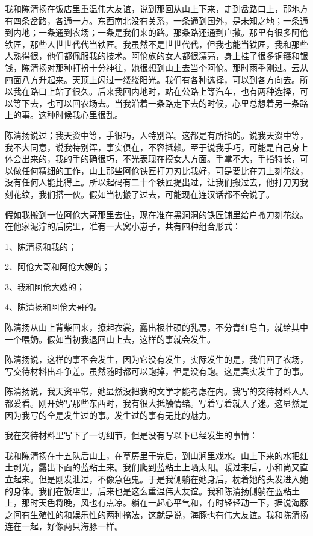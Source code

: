  我和陈清扬在饭店里重温伟大友谊，说到那回从山上下来，走到岔路口上，那地方有四条岔路，各通一方。东西南北没有关系，一条通到国外，是未知之地；一条通到内地；一条通到农场；一条是我们来的路。那条路还通到户撒。那里有很多阿伧铁匠，那些人世世代代当铁匠。我虽然不是世世代代，但我也能当铁匠，我和那些人熟得很，他们都佩服我的技术。阿伧族的女人都很漂亮，身上挂了很多铜箍和银钱，陈清扬对那种打扮十分神往，她很想到山上去当个阿伧。那时雨季刚过。云从四面八方升起来。天顶上闪过一缕缕阳光。我们有各种选择，可以到各方向去。所以我在路口上站了很久。后来我回内地时，站在公路上等汽车，也有两种选择，可以等下去，也可以回农场去。当我沿着一条路走下去的时候，心里总想着另一条路上的事。这种时候我心里很乱。 
 
 陈清扬说过；我天资中等，手很巧，人特别浑。这都是有所指的。说我天资中等，我不大同意，说我特别浑，事实俱在，不容抵赖。至于说我手巧，可能是自己身上体会出来的，我的手的确很巧，不光表现在摸女人方面。手掌不大，手指特长，可以做任何精细的工作，山上那些阿伧铁匠打刀刃比我好，可是要比在刀上刻花纹，没有任何人能比得上。所以起码有二十个铁匠提出过，让我们搬过去，他打刀刃我刻花纹，我们搭一伙。假如当初搬了过去，可能现在连汉话都不会说了。 
 
 假如我搬到一位阿伧大哥那里去住，现在准在黑洞洞的铁匠铺里给户撒刀刻花纹。在他家泥泞的后院里，准有一大窝小崽子，共有四种组合形式： 
 
 1、陈清扬和我的； 
 
 2、阿伧大哥和阿伧大嫂的； 
 
 3、我和阿伧大嫂的； 
 
 4、陈清扬和阿伧大哥的。 
 
 陈清扬从山上背柴回来，撩起衣裳，露出极壮硕的乳房，不分青红皂白，就给其中一个喂奶。假如当初我退回山上去，这样的事就会发生。 
 
 陈清扬说，这样的事不会发生，因为它没有发生，实际发生的是，我们回了农场，写交待材料出斗争差。虽然随时都可以跑掉，但是没有跑。这是真实发生了的事。 
 
 陈清扬说，我天资平常，她显然没把我的文学才能考虑在内。我写的交待材料人人都爱看。刚开始写那些东西时，我有很大抵触情绪。写着写着就入了迷。这显然是因为我写的全是发生过的事。发生过的事有无比的魅力。 
 
 我在交待材料里写下了一切细节，但是没有写以下已经发生的事情： 
 
 我和陈清扬在十五队后山上，在草房里干完后，到山涧里戏水。山上下来的水把红土剥光，露出下面的蓝粘土来。我们爬到蓝粘土上晒太阳。暖过来后，小和尚又直立起来。但是刚发泄过，不像急色鬼。于是我侧躺在她身后，枕着她的头发进入她的身体。我们在饭店里，后来也是这么重温伟大友谊。我和陈清扬侧躺在蓝粘土上，那时天色将晚，风也有点凉。躺在一起心平气和，有时轻轻动一下，据说海豚之间有生殖性的和娱乐性的两种搞法，这就是说，海豚也有伟大友谊。我和陈清扬连在一起，好像两只海豚一样。 
 
